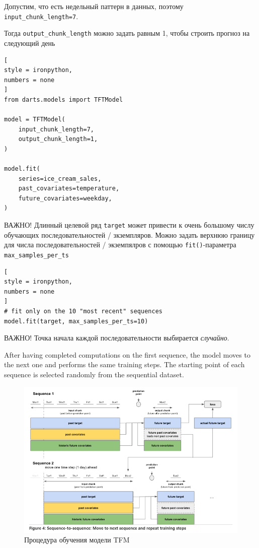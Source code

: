 \documentclass[%
	11pt,
	a4paper,
	utf8,
		]{article}
\begin{document}
Допустим, что есть недельный паттерн в данных, поэтому \verb|input_chunk_length=7|.

Тогда \verb|output_chunk_length| можно задать равным 1, чтобы строить прогноз на следующий день
\begin{lstlisting}[
style = ironpython,
numbers = none
]
from darts.models import TFTModel

model = TFTModel(
    input_chunk_length=7,
    output_chunk_length=1,
)

model.fit(
    series=ice_cream_sales,
    past_covariates=temperature,
    future_covariates=weekday,
)
\end{lstlisting}

ВАЖНО! Длинный целевой ряд \verb|target| может привести к очень большому числу обучающих последовательностей / зкземпляров. Можно задать верхнюю границу для числа последовательностей / экземпялров с помощью \verb|fit()|-параметра \verb|max_samples_per_ts|
\begin{lstlisting}[
style = ironpython,
numbers = none
]
# fit only on the 10 "most recent" sequences
model.fit(target, max_samples_per_ts=10)
\end{lstlisting}

{\color{blue}ВАЖНО! Точка начала каждой последовательности выбирается \emph{случайно}.}

After having completed computations on the first sequence, the model moves to the next one and performs the same training steps. The starting point of each sequence is selected randomly from the sequential dataset.

\begin{figure}[h]
	\centering
	\includegraphics[scale=0.9 ]{figures/darts_seq_to_seq.png}
	\caption{ Процедура обучения модели TFM }\label{fig:darts_seq_to_seq}
\end{figure}
\end{document}

